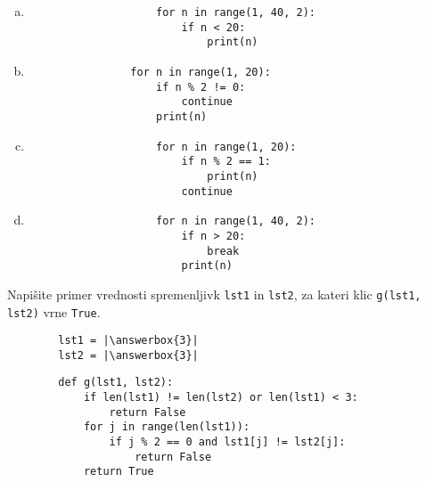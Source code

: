 \documentclass[arhiv, 10pt]{../izpit}
\newcommand{\inlinepy}[1]{\texttt{#1}}
\newcommand{\answerbox}[1]{\framebox{\vphantom{\large M}\hspace{#1cm}}}
\begin{document}
        \begin{multicols}{2}
        \begin{enumerate}[(a)]
\item 
                \begin{verbatim}
                    for n in range(1, 40, 2):
                        if n < 20:
                            print(n)
                \end{verbatim}
            
\item 
            \begin{verbatim}
                for n in range(1, 20):
                    if n % 2 != 0:
                        continue
                    print(n)
            \end{verbatim}
        
\item 
                \begin{verbatim}
                    for n in range(1, 20):
                        if n % 2 == 1:
                            print(n)
                        continue
                \end{verbatim}
            
\item 
                \begin{verbatim}
                    for n in range(1, 40, 2):
                        if n > 20:
                            break
                        print(n)
                \end{verbatim}
            
\end{enumerate}

        \end{multicols}
    
        \naloga*
        \begin{multicols}{2}
        \noindent
        Napišite primer vrednosti spremenljivk \inlinepy{lst1} in \inlinepy{lst2}, za kateri klic \inlinepy{g(lst1, lst2)} vrne \inlinepy{True}.
        \begin{verbatim}
        lst1 = |\answerbox{3}|
        lst2 = |\answerbox{3}|
        \end{verbatim}
        \vfil
        \columnbreak
        \begin{verbatim}
        def g(lst1, lst2):
            if len(lst1) != len(lst2) or len(lst1) < 3:
                return False
            for j in range(len(lst1)):
                if j % 2 == 0 and lst1[j] != lst2[j]:
                    return False
            return True
        \end{verbatim}
        \end{multicols}
    
\end{document}

